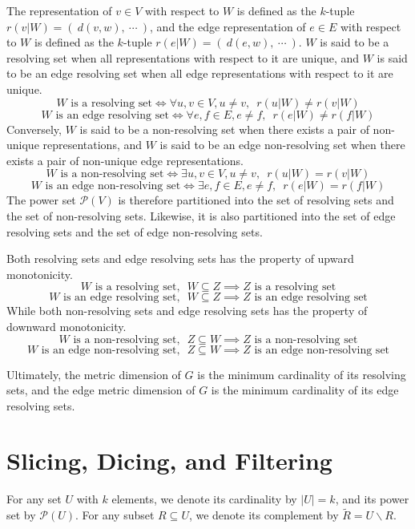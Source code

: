 \documentclass{article}
\begin{document}
The representation of \(v \in V\) with respect to \(W\) is defined as the \(k\)-tuple \(r(v|W) = (\ d(v, w),\ \cdots\ )\), and the edge representation of \(e \in E\) with respect to \(W\) is defined as the \(k\)-tuple \(r(e|W) = (\ d(e, w),\ \cdots\ )\). \(W\) is said to be a resolving set when all representations with respect to it are unique, and \(W\) is said to be an edge resolving set when all edge representations with respect to it are unique.
\[
	W \text{ is a resolving set} \iff \forall u, v \in V, u \neq v,\enspace r(u|W) \neq r(v|W)
\]
\[
	W \text{ is an edge resolving set} \iff \forall e, f \in E, e \neq f,\enspace r(e|W) \neq r(f|W)
\]
Conversely, \(W\) is said to be a non-resolving set when there exists a pair of non-unique representations, and \(W\) is said to be an edge non-resolving set when there exists a pair of non-unique edge representations.
\[
	W \text{ is a non-resolving set} \iff \exists u, v \in V, u \neq v,\enspace r(u|W) = r(v|W)
\]
\[
	W \text{ is an edge non-resolving set} \iff \exists e, f \in E, e \neq f,\enspace r(e|W) = r(f|W)
\]
The power set \(\mathcal{P}(V)\) is therefore partitioned into the set of resolving sets and the set of non-resolving sets. Likewise, it is also partitioned into the set of edge resolving sets and the set of edge non-resolving sets.

Both resolving sets and edge resolving sets has the property of upward monotonicity.
\[
	W \text{ is a resolving set},\enspace W \subseteq Z \implies Z \text{ is a resolving set}
\]
\[
	W \text{ is an edge resolving set},\enspace W \subseteq Z \implies Z \text{ is an edge resolving set}
\]
While both non-resolving sets and edge resolving sets has the property of downward monotonicity.
\[
	W \text{ is a non-resolving set},\enspace Z \subseteq W \implies Z \text{ is a non-resolving set}
\]
\[
	W \text{ is an edge non-resolving set},\enspace Z \subseteq W \implies Z \text{ is an edge non-resolving set}
\]

Ultimately, the metric dimension of \(G\) is the minimum cardinality of its resolving sets, and the edge metric dimension of \(G\) is the minimum cardinality of its edge resolving sets.

\section{Slicing, Dicing, and Filtering}

For any set \(U\) with \(k\) elements, we denote its cardinality by \(|U| = k\), and its power set by \(\mathcal{P}(U)\). For any subset \(R \subseteq U\), we denote its complement by \(\widetilde{R} = U \backslash R\).
\end{document}
